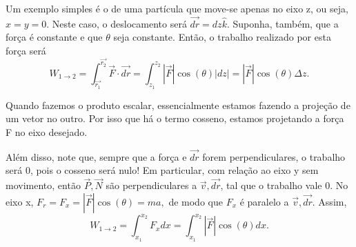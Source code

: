 \documentclass[PhysicsI/physics_notes.tex]{subfiles}
\begin{document}
\begin{example}
	Um exemplo simples é o de uma partícula que move-se apenas no eixo z, ou seja,
	\(x = y = 0.\) Neste caso, o deslocamento será \(\vec{dr} = dz \hat{k}\). Suponha,
	também, que a força é constante e que \(\theta \) seja constante. Então, o
	trabalho realizado por esta força será
	\[
		W_{1\rightarrow2} = \int_{\vec{r_{1}}}^{\vec{r_{2}}}\vec{F}\cdot \vec{dr} = \int_{z_{1}}^{z_{2}}|\vec{F}|\cos{(\theta )}|dz| = |\vec{F}|\cos{(\theta )}\Delta z.
	\]
\end{example}
Quando fazemos o produto escalar, essencialmente estamos fazendo a projeção de um
vetor no outro. Por isso que há o termo cosseno, estamos projetando a força F
no eixo desejado.

Além disso, note que, sempre que a força e \(\vec{dr}\) forem perpendiculares,
o trabalho será 0, pois o cosseno será nulo! Em particular, com relação
ao eixo y sem movimento, então \(\vec{P}, \vec{N}\) são perpendiculares a \(\vec{v}, \vec{dr}\), tal que
o trabalho vale 0. No eixo x, \(F_{r} = F_{x} = |\vec{F}|\cos{(\theta )} = ma,\)
de modo que \(F_{x}\) é paralelo a \(\vec{v}, \vec{dr}\). Assim,
\[
	W_{1\rightarrow 2} = \int_{x_{1}}^{x_{2}}F_{x}dx = \int_{x_{1}}^{x_{2}}|\vec{F}|\cos{(\theta )}dx.
\]
\end{document}
